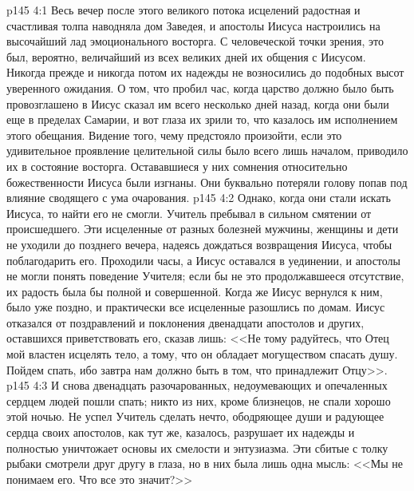 \vs p145 4:1 Весь вечер после этого великого потока исцелений радостная и счастливая толпа наводняла дом Заведея, и апостолы Иисуса настроились на высочайший лад эмоционального восторга. С человеческой точки зрения, это был, вероятно, величайший из всех великих дней их общения с Иисусом. Никогда прежде и никогда потом их надежды не возносились до подобных высот уверенного ожидания. О том, что пробил час, когда царство должно было быть провозглашено в  Иисус сказал им всего несколько дней назад, когда они были еще в пределах Самарии, и вот глаза их зрили то, что казалось им исполнением этого обещания. Видение того, чему предстояло произойти, если это удивительное проявление целительной силы было всего лишь началом, приводило их в состояние восторга. Остававшиеся у них сомнения относительно божественности Иисуса были изгнаны. Они буквально потеряли голову попав под влияние сводящего с ума очарования.
\vs p145 4:2 Однако, когда они стали искать Иисуса, то найти его не смогли. Учитель пребывал в сильном смятении от происшедшего. Эти исцеленные от разных болезней мужчины, женщины и дети не уходили до позднего вечера, надеясь дождаться возвращения Иисуса, чтобы поблагодарить его. Проходили часы, а Иисус оставался в уединении, и апостолы не могли понять поведение Учителя; если бы не это продолжавшееся отсутствие, их радость была бы полной и совершенной. Когда же Иисус вернулся к ним, было уже поздно, и практически все исцеленные разошлись по домам. Иисус отказался от поздравлений и поклонения двенадцати апостолов и других, оставшихся приветствовать его, сказав лишь: <<Не тому радуйтесь, что Отец мой властен исцелять тело, а тому, что он обладает могуществом спасать душу. Пойдем спать, ибо завтра нам должно быть в том, что принадлежит Отцу>>.
\vs p145 4:3 И снова двенадцать разочарованных, недоумевающих и опечаленных сердцем людей пошли спать; никто из них, кроме близнецов, не спали хорошо этой ночью. Не успел Учитель сделать нечто, ободряющее души и радующее сердца своих апостолов, как тут же, казалось, разрушает их надежды и полностью уничтожает основы их смелости и энтузиазма. Эти сбитые с толку рыбаки смотрели друг другу в глаза, но в них была лишь одна мысль: <<Мы не понимаем его. Что все это значит?>>
